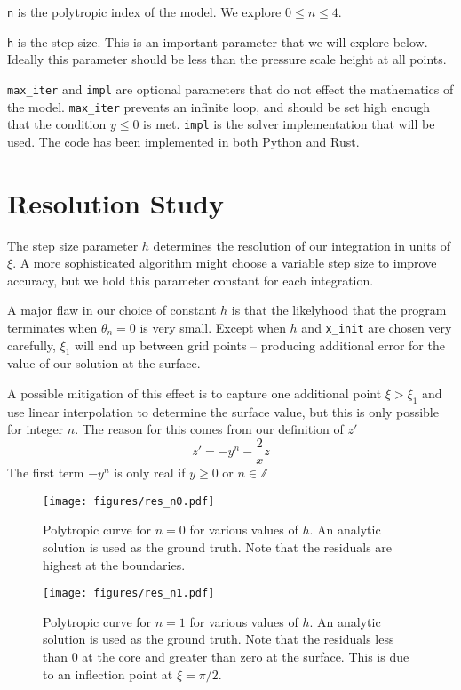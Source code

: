\documentclass[twocolumn]{aastex631}
\begin{document}
\texttt{n} is the polytropic index of the model. We explore
$0\le n \le 4$.

\texttt{h} is the step size. This is an important parameter that we will
explore below. Ideally this parameter should be less than
the pressure scale height at all points.

\texttt{max\_iter} and \texttt{impl} are optional parameters that do not
effect the mathematics of the model. \texttt{max\_iter} prevents
an infinite loop, and should be set high enough that the
condition $y\le 0$ is met. \texttt{impl} is the solver
implementation that will be used. The code has been implemented
in both Python and Rust.


\section{Resolution Study}
\label{sec:res}

The step size parameter $h$ determines the resolution of our integration
in units of $\xi$. A more sophisticated algorithm might choose a variable
step size to improve accuracy, but we hold this parameter constant
for each integration.

A major flaw in our choice of constant $h$ is that the likelyhood that
the program terminates when $\theta_n=0$ is very small. Except when $h$
and \texttt{x\_init} are chosen very carefully, $\xi_1$ will end up
between grid points -- producing additional error for the value
of our solution at the surface.

A possible mitigation of this effect is to capture one additional point
$\xi>\xi_1$ and use linear interpolation to determine the surface value,
but this is only possible for integer $n$. The reason for this comes from
our definition of $z'$
\[
    z' = -y^n - \frac{2}{x}z
\]
The first term $-y^n$ is only real if $y\ge0$ or $n \in \mathbb{Z}$

\begin{figure}
    \begin{centering}
        \texttt{[image: figures/res\_n0.pdf]}
        \caption{Polytropic curve for $n=0$ for various
        values of $h$. An analytic solution is used as
        the ground truth. Note that the residuals are highest
        at the boundaries.}
        \label{fig:res_n0}
    \end{centering}
\end{figure}

\begin{figure}
    \begin{centering}
        \texttt{[image: figures/res\_n1.pdf]}
        \caption{Polytropic curve for $n=1$ for various
        values of $h$. An analytic solution is used as
        the ground truth. Note that the residuals less than 0
        at the core and greater than zero at the surface. This
        is due to an inflection point at $\xi=\pi/2$.}
        \label{fig:res_n1}
    \end{centering}
\end{figure}






\end{document}

